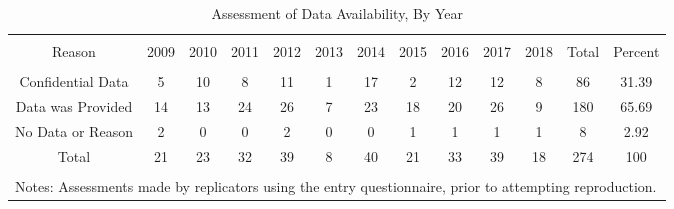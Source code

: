 \documentclass{cje_appendix} %
\theoremstyle{plain}%
\theoremstyle{definition}
\theoremstyle{remark}
\begin{document}
 \begin{sidewaystable} \centering 
\scriptsize
  \caption{Assessment of Data Availability, By Year} 
  \label{tab:absence} 
\begin{tabular}{@{\extracolsep{0.4pt}} ccccccccccccc} 
\\[-1.8ex]\hline 
\hline \\[-1.8ex] 
Reason & 2009 & 2010 & 2011 & 2012 & 2013 & 2014 & 2015 & 2016 & 2017 & 2018 & Total & Percent \\ 
\hline \\[-1.8ex] 
Confidential Data & 5 & 10 & 8 & 11 & 1 & 17 & 2 & 12 & 12 & 8 & 86 & 31.39 \\ 
Data was Provided & 14 & 13 & 24 & 26 & 7 & 23 & 18 & 20 & 26 & 9 & 180 & 65.69 \\ 
No Data or Reason & 2 & 0 & 0 & 2 & 0 & 0 & 1 & 1 & 1 & 1 & 8 & 2.92 \\ 
Total & 21 & 23 & 32 & 39 & 8 & 40 & 21 & 33 & 39 & 18 & 274 & 100 \\ 
\hline \\[-1.8ex] 
\multicolumn{13}{l}{\footnotesize Notes: Assessments made  by replicators using the entry questionnaire, prior to attempting reproduction.} \\ 
\end{tabular} 
 \end{sidewaystable}
\end{document}
